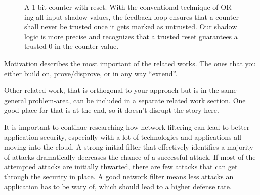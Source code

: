 \begin{figure}[t]
\begin{center}
\vspace{-0.2in}
\caption{A 1-bit counter with reset. With the conventional technique of OR-ing all input shadow values, the feedback loop ensures that a 
counter shall never be trusted once it gets marked as untrusted. Our shadow logic is more precise and recognizes that a trusted reset 
guarantees a trusted $0$ in the counter value.}
\label{fig:1bcounter}
\end{center}
\end{figure}

Motivation describes the most important of the related works. The ones that 
you either build on, prove/disprove, or in any way ``extend''. 

Other related work, that is orthogonal to your approach but is in the same
general problem-area, can be included in a separate related work section.
One good place for that is at the end, so it doesn't disrupt the story here.

It is important to continue researching how network filtering can lead to better application security, especially with a lot of technologies and applications all moving into the cloud.
A strong initial filter that effectively identifies a majority of attacks dramatically decreases the chance of a successful attack. If most of the attempted attacks are initially thwarted,
there are few attacks that can get through the security in place. A good network filter means less attacks an application has to be wary of, which should lead to a higher defense rate.